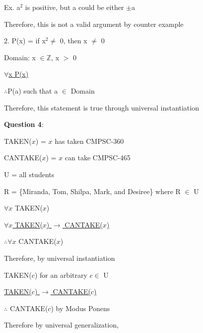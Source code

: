 \documentclass{article} %
\newcommand{\question}[2][]{\begin{flushleft}
        \textbf{Question #1}: \textit{#2}

\end{flushleft}}
\begin{document}
    \tabto*{0.96cm}Ex. a$^2$ is positive, but a could be either $\pm$a

    \tabto*{0.96cm}Therefore, this is not a valid argument by counter example

    \hspace*{0.2cm}
    
    2. P(x) = if x$^2 \neq$ 0, then x $\neq$ 0 

    \tabto*{0.96cm}Domain: x $\in \mathbb{Z}$, x $>$ 0

    \tabto*{0.96cm}\underline{$\forall$x P(x) \phantom{aaaaaaaaaaaaaaaaaa}}

    \tabto*{0.96cm}$\therefore$P(a) such that a $\in$ Domain

    \tabto*{0.96cm}Therefore, this statement is true through universal instantiation

                                                                     
    \question[4]{}

    TAKEN($x$) = $x$ has taken CMPSC-360

    CANTAKE($x$) = $x$ can take CMPSC-465

    U = all students

    R = \{Miranda, Tom, Shilpa, Mark, and Desiree\} where R $\in$ U

    \vspace*{0.2cm}

    $\forall x$ TAKEN($x$)

    \underline{$\forall x$ TAKEN($x$) $\rightarrow$ CANTAKE($x$)}

    $\therefore \forall x$ CANTAKE($x$)

    \vspace*{0.2cm}
    Therefore, by universal instantiation

    TAKEN($c$) for an arbitrary $c \in$ U

    \underline{TAKEN($c$) $\rightarrow$ CANTAKE($c$)}

    $\therefore$ CANTAKE($c$) by Modus Ponens

    \vspace*{0.2cm}
    Therefore by universal generalization,
\end{document}
